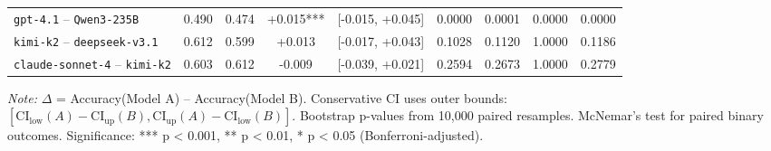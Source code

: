 \begin{table}[htbp]
{\begin{tabular}{lcccccccc}
\texttt{gpt-4.1} -- \texttt{Qwen3-235B} & 0.490 & 0.474 & +0.015*** & [-0.015, +0.045] & 0.0000 & 0.0001 & 0.0000 & 0.0000 \\
\texttt{kimi-k2} -- \texttt{deepseek-v3.1} & 0.612 & 0.599 & +0.013 & [-0.017, +0.043] & 0.1028 & 0.1120 & 1.0000 & 0.1186 \\
\texttt{claude-sonnet-4} -- \texttt{kimi-k2} & 0.603 & 0.612 & -0.009 & [-0.039, +0.021] & 0.2594 & 0.2673 & 1.0000 & 0.2779 \\
\bottomrule
\end{tabular}
}
\vspace{2mm}
\footnotesize
\textit{Note:} $\Delta$ = Accuracy(Model A) -- Accuracy(Model B).
Conservative CI uses outer bounds: $[\mathrm{CI}_{\text{low}}(A)-\mathrm{CI}_{\text{up}}(B), \mathrm{CI}_{\text{up}}(A)-\mathrm{CI}_{\text{low}}(B)]$.
Bootstrap p-values from 10,000 paired resamples. McNemar's test for paired binary outcomes.
Significance: *** p < 0.001, ** p < 0.01, * p < 0.05 (Bonferroni-adjusted).
\end{table}

